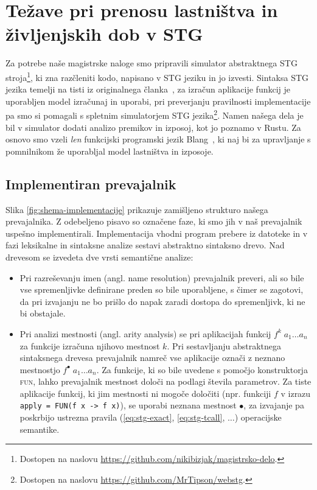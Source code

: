 \chapter[Lastništvo in izposoja v STG]{Težave pri prenosu lastništva in življenjskih dob v STG}
\label{ch:problemi}

Za potrebe naše magistrske naloge smo pripravili simulator abstraktnega STG stroja\footnote{Dostopen na naslovu \url{https://github.com/nikibizjak/magistrsko-delo}.}, ki zna razčleniti kodo, napisano v STG jeziku in jo izvesti. Sintaksa STG jezika temelji na tisti iz originalnega članka~\cite{marlow2004making}, za izračun aplikacije funkcij je uporabljen model izračunaj in uporabi, pri preverjanju pravilnosti implementacije pa smo si pomagali s spletnim simulatorjem STG jezika\footnote{Dostopen na naslovu \url{https://github.com/MrTipson/webstg}.}. Namen našega dela je bil v simulator dodati analizo premikov in izposoj, kot jo poznamo v Rustu. Za osnovo smo vzeli \emph{len} funkcijski programski jezik Blang~\cite{turk2022len}, ki naj bi za upravljanje s pomnilnikom že uporabljal model lastništva in izposoje.


\section{Implementiran prevajalnik}
Slika \ref{fig:shema-implementacije} prikazuje zamišljeno strukturo našega prevajalnika. Z odebeljeno pisavo so označene faze, ki smo jih v naš prevajalnik uspešno implementirali. Implementacija vhodni program prebere iz datoteke in v fazi leksikalne in sintaksne analize sestavi abstraktno sintaksno drevo. Nad drevesom se izvedeta dve vrsti semantične analize:
\begin{itemize}
    \itemsep 0em
    \item Pri razreševanju imen (angl. name resolution) prevajalnik preveri, ali so bile vse spremenljivke definirane preden so bile uporabljene, s čimer se zagotovi, da pri izvajanju ne bo prišlo do napak zaradi dostopa do spremenljivk, ki ne bi obstajale.
    \item Pri analizi mestnosti (angl. arity analysis) se pri aplikacijah funkcij $f^k \; a_1 \dots a_n$ za funkcije izračuna njihovo mestnost $k$. Pri sestavljanju abstraktnega sintaksnega drevesa prevajalnik namreč vse aplikacije označi z neznano mestnostjo $f^{\bullet} \; a_1 \dots a_n$. Za funkcije, ki so bile uvedene s pomočjo konstruktorja \textsc{fun}, lahko prevajalnik mestnost določi na podlagi števila parametrov. Za tiste aplikacije funkcij, ki jim mestnosti ni mogoče določiti (npr. funkciji $f$ v izrazu \texttt{apply = FUN(f x -> f x)}), se uporabi neznana mestnost $\bullet$, za izvajanje pa poskrbijo  ustrezna pravila (\ref{eq:stg-exact}, \ref{eq:stg-tcall}, $\dots$) operacijske semantike.
\end{itemize}


